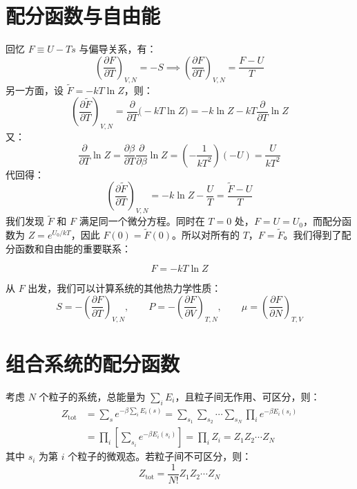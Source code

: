 \section{配分函数与自由能}
回忆 $F\equiv U-Ts$ 与偏导关系，有：
\begin{equation}
    \left(\frac{\partial F}{\partial T}\right)_{V,N}=-S
    \implies
    \left(\frac{\partial F}{\partial T}\right)_{V,N}=\frac{F-U}{T}
\end{equation}
另一方面，设 $\widetilde{F}=-kT\ln Z$，则：
\begin{equation}
    \left(\frac{\partial \widetilde{F}}{\partial T}\right)_{V,N}
    =\frac{\partial}{\partial T}\bigl(-kT\ln Z\bigr)
    =-k\ln Z-kT\frac{\partial}{\partial T}\ln Z
\end{equation}
又：
\begin{equation}
    \frac{\partial}{\partial T}\ln Z
    =\frac{\partial \beta}{\partial T}\frac{\partial}{\partial \beta}\ln Z
    =\left(-\frac{1}{kT^2}\right)(-U)
    =\frac{U}{kT^2}
\end{equation}
代回得：
\begin{equation}
    \left(\frac{\partial \widetilde{F}}{\partial T}\right)_{V,N}
    =-k\ln Z-\frac{U}{T}=\frac{\widetilde{F}-U}{T}
\end{equation}
我们发现 $\widetilde{F}$ 和 $F$ 满足同一个微分方程。同时在 $T=0$ 处，$F = U = U_0$，而配分函数为 $Z = e^{U_0/kT}$，因此 $F(0) = \widetilde{F}(0)$。所以对所有的 $T$，$F=\widetilde{F}$。我们得到了配分函数和自由能的重要联系：
\begin{corollary}[配分函数和自由能]
    \begin{equation}
        F = -kT \ln Z
    \end{equation}
\end{corollary}
从 $F$ 出发，我们可以计算系统的其他热力学性质：
\begin{equation}
    S=-\left(\frac{\partial F}{\partial T}\right)_{V,N},\qquad
    P=-\left(\frac{\partial F}{\partial V}\right)_{T,N},\qquad
    \mu=\left(\frac{\partial F}{\partial N}\right)_{T,V}    
\end{equation}

\section{组合系统的配分函数}
考虑 $N$ 个粒子的系统，总能量为 $\sum_i E_i$，且粒子间无作用、可区分，则：
\begin{equation}
    \begin{split}
        Z_{\mathrm{tot}}
        &=\sum_s e^{-\beta\sum_i E_i(s)}
        =\sum_{s_1}\sum_{s_2}\cdots\sum_{s_N}\prod_i e^{-\beta E_i(s_i)}\\
        &=\prod_i\left[\sum_{s_i}e^{-\beta E_i(s_i)}\right]
        =\prod_i Z_i
        =Z_1Z_2\cdots Z_N
    \end{split}
\end{equation}
其中 $s_i$ 为第 $i$ 个粒子的微观态。若粒子间不可区分，则：
\begin{equation}
    Z_{\mathrm{tot}}=\frac{1}{N!}Z_1Z_2\cdots Z_N
\end{equation}

